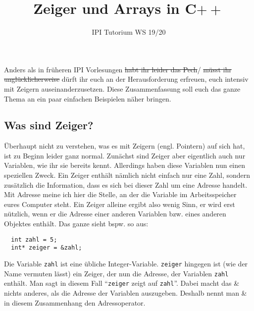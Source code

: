 \documentclass[
fontsize = 11pt,
paper    = a4,
BCOR     = 5mm,
DIV      = 12,
numbers  = noenddot,
]{scrartcl}
\title{Zeiger und Arrays in C$++$}
\author{IPI Tutorium WS 19/20}
\date{}
\begin{document}
\maketitle
Anders als in früheren IPI Vorlesungen \sout{habt ihr leider das
  Pech}/ \sout{müsst ihr unglücklicherweise} dürft ihr euch an der
Herausforderung erfreuen, euch intensiv mit Zeigern
auseinanderzusetzen. Diese Zusammenfassung soll euch das ganze Thema
an ein paar einfachen Beispielen näher bringen.

\subsection*{Was sind Zeiger?}
Überhaupt nicht zu verstehen, was es mit Zeigern (engl. Pointern) auf
sich hat, ist zu Beginn leider ganz normal. Zunächst sind Zeiger aber
eigentlich auch nur Variablen, wie ihr sie bereits kennt. Allerdings
haben diese Variablen nun einen speziellen Zweck. Ein Zeiger enthält
nämlich nicht einfach nur eine Zahl, sondern zusätzlich die
Information, dass es sich bei dieser Zahl um eine Adresse handelt. Mit
Adresse meine ich hier die Stelle, an der die Variable im
Arbeitsspeicher eures Computer steht. Ein Zeiger alleine ergibt also
wenig Sinn, er wird erst nützlich, wenn er die Adresse einer anderen
Variablen bzw. eines anderen Objektes enthält. Das ganze sieht
bspw. so aus:
\begin{lstlisting}
  int zahl = 5;
  int* zeiger = &zahl;
\end{lstlisting}
Die Variable \lstinline{zahl} ist eine übliche
Integer-Variable. \lstinline{zeiger} hingegen ist (wie der Name
vermuten lässt) ein Zeiger, der nun die Adresse, der Variablen
\lstinline{zahl} enthält. Man sagt in diesem Fall ``\lstinline{zeiger}
zeigt auf \lstinline{zahl}''. Dabei macht das \& nichts anderes, als
die Adresse der Variablen auszugeben. Deshalb nennt man \& in diesem
Zusammenhang den Adressoperator.
\end{document}
